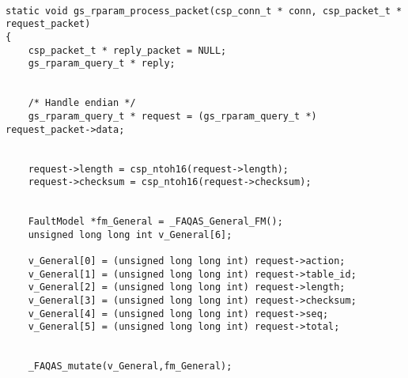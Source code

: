 \begin{lstlisting}[style=CStyle, caption=Example of data-driven mutation probe for libParam, label=GSLmutate]

static void gs_rparam_process_packet(csp_conn_t * conn, csp_packet_t * request_packet)
{
    csp_packet_t * reply_packet = NULL;
    gs_rparam_query_t * reply;


    /* Handle endian */
    gs_rparam_query_t * request = (gs_rparam_query_t *) request_packet->data;


    request->length = csp_ntoh16(request->length);
    request->checksum = csp_ntoh16(request->checksum);


    FaultModel *fm_General = _FAQAS_General_FM();
    unsigned long long int v_General[6];

    v_General[0] = (unsigned long long int) request->action;
    v_General[1] = (unsigned long long int) request->table_id;
    v_General[2] = (unsigned long long int) request->length;
    v_General[3] = (unsigned long long int) request->checksum;
    v_General[4] = (unsigned long long int) request->seq;
    v_General[5] = (unsigned long long int) request->total;


    _FAQAS_mutate(v_General,fm_General);
    
\end{lstlisting}



%
%
%
